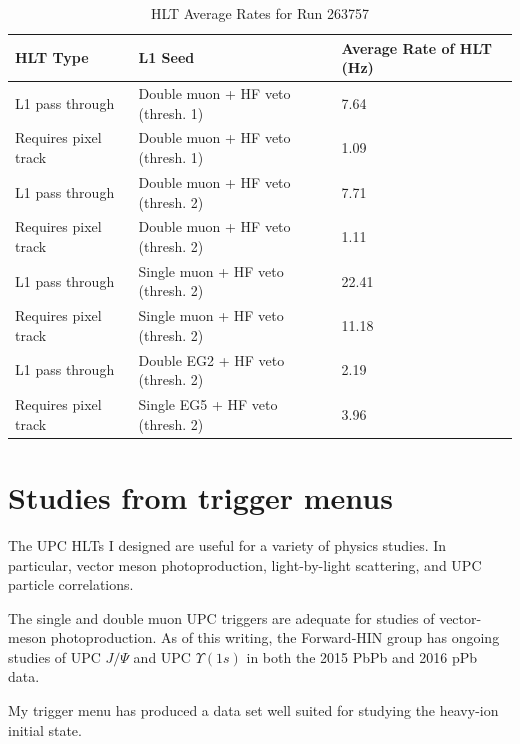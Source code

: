 \begin{table}[h!]
\centering
\caption{HLT Average Rates for Run 263757}
\label{my-label}
\begin{tabular}{@{}lll@{}}
\toprule
HLT Type             & L1 Seed                           & Average Rate of HLT (Hz) \\ \midrule
L1 pass through      & Double muon + HF veto (thresh. 1) & 7.64                     \\
Requires pixel track & Double muon + HF veto (thresh. 1) & 1.09                     \\
L1 pass through      & Double muon + HF veto (thresh. 2) & 7.71                     \\
Requires pixel track & Double muon + HF veto (thresh. 2) & 1.11                     \\
L1 pass through      & Single muon + HF veto (thresh. 2) & 22.41                    \\
Requires pixel track & Single muon + HF veto (thresh. 2) & 11.18                    \\
L1 pass through      & Double EG2 + HF veto (thresh. 2)  & 2.19                     \\
Requires pixel track & Single EG5 + HF veto (thresh. 2)  & 3.96                     \\ \bottomrule
\end{tabular}
\end{table}

\section{Studies from trigger menus}

The UPC HLTs I designed are useful for a variety of physics studies. In particular, vector meson photoproduction, light-by-light scattering, and UPC particle correlations. 

The single and double muon UPC triggers are adequate for studies of vector-meson photoproduction. As of this writing, the Forward-HIN group has ongoing studies of UPC $J/\Psi$ and UPC $\Upsilon(1s)$ in both the 2015 PbPb and 2016 pPb data. 

My trigger menu has produced a data set well suited for studying the heavy-ion initial state.